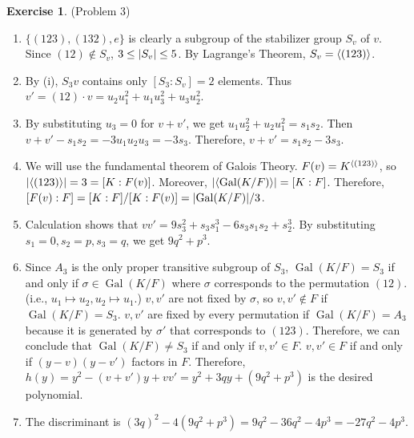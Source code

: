 \documentclass[12pt, psamsfonts]{amsart}
\theoremstyle{definition}
\newtheorem*{exer}{Exercise}
\theoremstyle{remark}
\DeclareMathOperator{\Gal}{Gal}
\numberwithin{equation}{section}
\begin{document}
\begin{exer}{(Problem 3)}
  \begin{enumerate}[label=(\roman*)]
    \item
      $\{ (123), (132), e \}$ is clearly a subgroup of the stabilizer group $S_v$ of $v$.
      Since $(12) \notin S_v$, $3 \leq \abs{S_v} \leq 5$.
      By Lagrange's Theorem, $S_v = \ev{(123)}$. 
    \item
      By (i), $S_3v$ contains only $[S_3:S_v] = 2$ elements.
      Thus $v' = (12) \cdot v = u_2u_1^2 + u_1u_3^2 + u_3u_2^2$.
    \item
      By substituting $u_3 = 0$ for $v + v'$, we get $u_1u_2^2 + u_2u_1^2 = s_1s_2$.
      Then $v + v' - s_1s_2 = -3u_1u_2u_3 = -3s_3$.
      Therefore, $v + v' = s_1s_2 - 3s_3$.
    \item
      We will use the fundamental theorem of Galois Theory.
      $F(v) = K^{\ev{(123)}}$, so $\abs{\ev{(123)}} = 3 = [K:F(v)]$.
      Moreover, $\abs{\ev{\Gal(K/F)}} = [K:F]$.
      Therefore, $[F(v):F] = [K:F]/[K:F(v)] = \abs{\Gal(K/F)}/3$.
    \item
      Calculation shows that $vv' = 9s_3^2 + s_3s_1^3 - 6s_3s_1s_2 + s_2^3$.
      By substituting $s_1 = 0, s_2 = p, s_3 = q$, we get $9q^2 + p^3$.
    \item
      Since $A_3$ is the only proper transitive subgroup of $S_3$, $\Gal(K/F) = S_3$ if and only if $\sigma \in \Gal(K/F)$ where $\sigma$ corresponds to the permutation $(12)$.
      (i.e., $u_1 \mapsto u_2, u_2 \mapsto u_1$.)
      $v, v'$ are not fixed by $\sigma$, so $v, v' \notin F$ if $\Gal(K/F) = S_3$.
      $v, v'$ are fixed by every permutation if $\Gal(K/F) = A_3$ because it is generated by $\sigma'$ that corresponds to $(123)$.
      Therefore, we can conclude that $\Gal(K/F) \ne S_3$ if and only if $v, v' \in F$.
      $v, v' \in F$ if and only if $(y - v)(y - v')$ factors in $F$.
      Therefore, $h(y) = y^2 - (v + v')y + vv' = y^2 + 3qy + (9q^2 + p^3)$ is the desired polynomial.
    \item
      The discriminant is $(3q)^2 - 4(9q^2 + p^3) = 9q^2 - 36q^2 - 4p^3 = -27q^2 - 4p^3$.
  \end{enumerate}
\end{exer}
\end{document}
